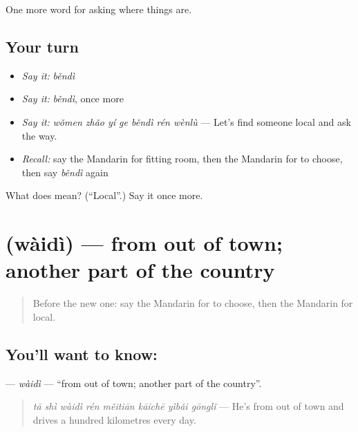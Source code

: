 \begin{grammarlens}[title={What you've built}]
One more word for asking where things are.
\end{grammarlens}

\subsection*{Your turn}
\begin{itemize}
\raggedright
  \item \emph{Say it:} \emph{běndì}
  \item \emph{Say it:} \emph{běndì}, once more
  \item \emph{Say it:} \emph{wǒmen zhǎo yí ge běndì rén wènlù} — Let's find someone local and ask the way.
  \item \emph{Recall:} say the Mandarin for fitting room, then the Mandarin for to choose, then say \emph{běndì} again
\end{itemize}

\begin{tcolorbox}[breakable,colback=teal!4,colframe=teal!35!black,title={Before you move on}]
What does  mean? (\textquotedblleft{}Local\textquotedblright{}.) Say it once more.
\end{tcolorbox}
\section[\texorpdfstring{\zh{外地} (wàidì)}{外地 (wàidì)}]{ (wàidì) — from out of town; another part of the country}

\label{lesson:ZH-C211-waidi}



\begin{quote}
Before the new one: say the Mandarin for to choose, then the Mandarin for local.
\end{quote}

\subsection*{You'll want to know: }
\textbf{} — \emph{wàidì} — \textquotedblleft{}from out of town; another part of the country\textquotedblright{}.

\begin{quote}
\textbf{} \emph{tā shì wàidì rén měitiān kāichē yìbǎi gōnglǐ} — He's from out of town and drives a hundred kilometres every day.
\end{quote}

